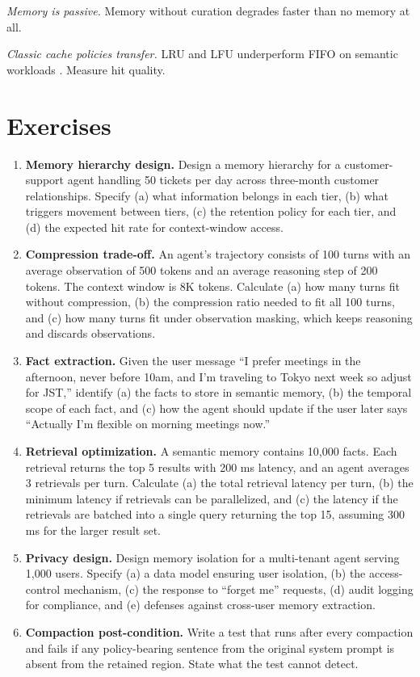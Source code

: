 \documentclass[11pt]{book}
\begin{document}
\textit{Memory is passive.} Memory without curation degrades faster than no memory at all.

\textit{Classic cache policies transfer.} LRU and LFU underperform FIFO on semantic workloads \cite{cachepolicy2026}. Measure hit quality.

\section*{Exercises}

\begin{enumerate}
\item \textbf{Memory hierarchy design.} Design a memory hierarchy for a customer-support agent handling 50 tickets per day across three-month customer relationships. Specify (a) what information belongs in each tier, (b) what triggers movement between tiers, (c) the retention policy for each tier, and (d) the expected hit rate for context-window access.

\item \textbf{Compression trade-off.} An agent's trajectory consists of 100 turns with an average observation of 500 tokens and an average reasoning step of 200 tokens. The context window is 8K tokens. Calculate (a) how many turns fit without compression, (b) the compression ratio needed to fit all 100 turns, and (c) how many turns fit under observation masking, which keeps reasoning and discards observations.

\item \textbf{Fact extraction.} Given the user message ``I prefer meetings in the afternoon, never before 10am, and I'm traveling to Tokyo next week so adjust for JST,'' identify (a) the facts to store in semantic memory, (b) the temporal scope of each fact, and (c) how the agent should update if the user later says ``Actually I'm flexible on morning meetings now.''

\item \textbf{Retrieval optimization.} A semantic memory contains 10{,}000 facts. Each retrieval returns the top 5 results with 200 ms latency, and an agent averages 3 retrievals per turn. Calculate (a) the total retrieval latency per turn, (b) the minimum latency if retrievals can be parallelized, and (c) the latency if the retrievals are batched into a single query returning the top 15, assuming 300 ms for the larger result set.

\item \textbf{Privacy design.} Design memory isolation for a multi-tenant agent serving 1{,}000 users. Specify (a) a data model ensuring user isolation, (b) the access-control mechanism, (c) the response to ``forget me'' requests, (d) audit logging for compliance, and (e) defenses against cross-user memory extraction.

\item \textbf{Compaction post-condition.} Write a test that runs after every compaction and fails if any policy-bearing sentence from the original system prompt is absent from the retained region. State what the test cannot detect.
\end{enumerate}
\end{document}
